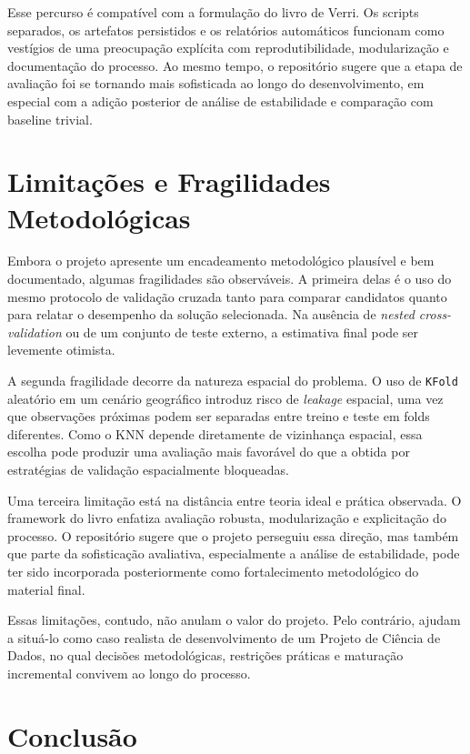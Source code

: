 \documentclass[12pt]{report}
\begin{document}
Esse percurso é compatível com a formulação do livro de Verri. Os scripts separados, os artefatos persistidos e os relatórios automáticos funcionam como vestígios de uma preocupação explícita com reprodutibilidade, modularização e documentação do processo. Ao mesmo tempo, o repositório sugere que a etapa de avaliação foi se tornando mais sofisticada ao longo do desenvolvimento, em especial com a adição posterior de análise de estabilidade e comparação com baseline trivial.

\chapter{Limitações e Fragilidades Metodológicas}

Embora o projeto apresente um encadeamento metodológico plausível e bem documentado, algumas fragilidades são observáveis. A primeira delas é o uso do mesmo protocolo de validação cruzada tanto para comparar candidatos quanto para relatar o desempenho da solução selecionada. Na ausência de \textit{nested cross-validation} ou de um conjunto de teste externo, a estimativa final pode ser levemente otimista.

A segunda fragilidade decorre da natureza espacial do problema. O uso de \texttt{KFold} aleatório em um cenário geográfico introduz risco de \textit{leakage} espacial, uma vez que observações próximas podem ser separadas entre treino e teste em folds diferentes. Como o KNN depende diretamente de vizinhança espacial, essa escolha pode produzir uma avaliação mais favorável do que a obtida por estratégias de validação espacialmente bloqueadas.

Uma terceira limitação está na distância entre teoria ideal e prática observada. O framework do livro enfatiza avaliação robusta, modularização e explicitação do processo. O repositório sugere que o projeto perseguiu essa direção, mas também que parte da sofisticação avaliativa, especialmente a análise de estabilidade, pode ter sido incorporada posteriormente como fortalecimento metodológico do material final.

Essas limitações, contudo, não anulam o valor do projeto. Pelo contrário, ajudam a situá-lo como caso realista de desenvolvimento de um Projeto de Ciência de Dados, no qual decisões metodológicas, restrições práticas e maturação incremental convivem ao longo do processo.

\chapter{Conclusão}
\end{document}

